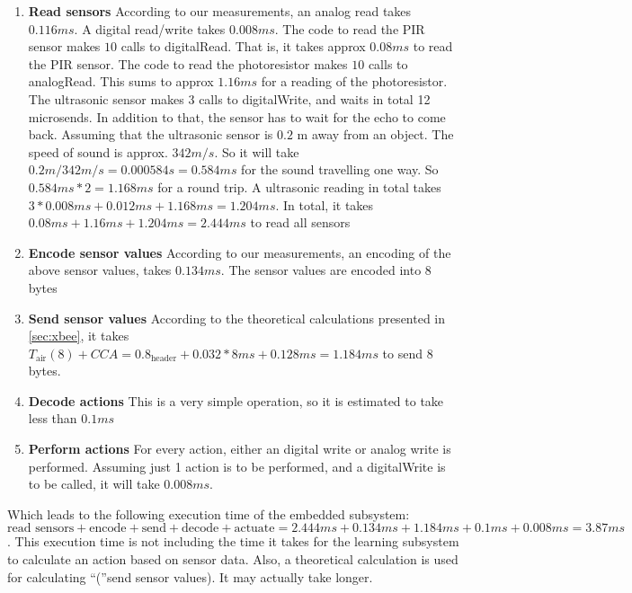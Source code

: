  \begin{enumerate}
  \item \textbf{Read sensors} According to our measurements, an analog read takes $0.116 ms$. A digital read/write takes $0.008 ms$. The code to read the PIR sensor makes $10$ calls to digitalRead. That is, it takes approx $0.08 ms$ to read the PIR sensor. The code to read the photoresistor makes $10$ calls to analogRead. This sums to approx $1.16 ms$ for a reading of the photoresistor. The ultrasonic sensor makes 3 calls to digitalWrite, and waits in total 12 microsends. In addition to that, the sensor has to wait for the echo to come back. Assuming that the ultrasonic sensor is $0.2$ m away from an object. The speed of sound is approx. $342 m/s$. So it will take $0.2 m / 342 m/s = 0.000584 s = 0.584 ms$ for the sound travelling one way. So $0.584 ms * 2 = 1.168 ms$ for a round trip. A ultrasonic reading in total takes $3 * 0.008 ms + 0.012 ms + 1.168 ms = 1.204 ms$. In total, it takes $0.08 ms + 1.16 ms + 1.204 ms = 2.444 ms$ to read all sensors
  \item \textbf{Encode sensor values} According to our measurements, an encoding of the above sensor values, takes $0.134 ms$. The sensor values are encoded into 8 bytes
  \item \textbf{Send sensor values} According to the theoretical calculations presented in \cref{sec:xbee}, it takes $T_{\text{air}}(8) + CCA = 0.8_{\text{header}} + 0.032*8 ms + 0.128 ms = 1.184 ms$ to send 8 bytes.
  \item \textbf{Decode actions} This is a very simple operation, so it is estimated to take less than $0.1 ms$
  \item \textbf{Perform actions} For every action, either an digital write or analog write is performed. Assuming just 1 action is to be performed, and a digitalWrite is to be called, it will take $0.008 ms$. 
\end{enumerate}

Which leads to the following execution time of the embedded subsystem: $\text{read sensors} + \text{encode} + \text{send} + \text{decode} + \text{actuate} = 2.444 ms + 0.134 ms + 1.184 ms + 0.1 ms + 0.008 ms = 3.87 ms$. This execution time is not including the time it takes for the learning subsystem to calculate an action based on sensor data. Also, a theoretical calculation is used for calculating \enquote(send sensor values). It may actually take longer.
